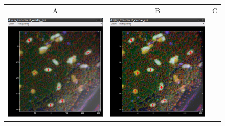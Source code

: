 \begin{figure}[!ht]
\centering
\begin{tabular}{ccc}
A & B & C \\
\includegraphics[scale=0.23]{figs7/LANS-ext-result1}
&
\includegraphics[scale=0.23]{figs7/LANS-ext-result2}

\end{tabular}
\end{figure}
